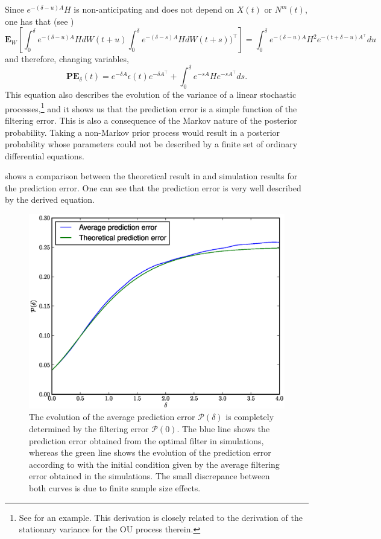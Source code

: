 Since $ e^{-(\delta-u)A} H$ is non-anticipating and does not depend on $X(t)$ or $N^m(t)$, one has that (see )
$$
\boldsymbol{E}_{W}\left[\int_0^{\delta} e^{-(\delta-u)A} Hd W(t+u) \int_0^{\delta} e^{-(\delta-s)A} H dW(t+s))^\top \right] = \int_0^{\delta} e^{-(\delta-u)A}H^2 e^{-(t+\delta-u)A^\top} d u
$$
and therefore, changing variables,
\begin{equation}
\boldsymbol{PE}_\delta(t)= e^{-\delta A} \epsilon(t) e^{-\delta A^\top} + \int_{0}^\delta e^{-s A} H e^{-s A^\top}d s.
\label{eq:pred_error}
\end{equation}
This equation also describes the evolution of the variance of a linear stochastic processes,\footnote{See \citep[p.106]{Gardiner2004} for an example. This derivation is closely related to 
the derivation of the stationary variance for the OU process therein.} and it shows us that the prediction error is a simple function of the filtering error. This is also a consequence of the 
Markov nature of the posterior probability. Taking a non-Markov prior process would result in a posterior probability whose parameters could not be described by a finite set of ordinary 
differential equations.\par
{}  shows a comparison between the theoretical result in  and simulation results for the prediction error. One can see that the prediction error is very well described by the derived equation.
\begin{figure}
\label{fig:prediction}
\includegraphics[width=.9\columnwidth]{figures/figure_3_3.eps}
\caption[Prediction Error.]{The evolution of the average prediction error $\mathcal{P}(\delta)$ is completely determined by the filtering error $\mathcal{P}(0)$. The blue line shows the prediction error obtained from the optimal filter in simulations, whereas the green line shows the evolution of the prediction error according to  with the initial condition given by the average filtering error obtained in the simulations. The small discrepance between both curves is due to finite sample size effects.}
\end{figure}

